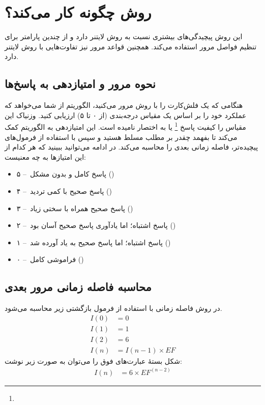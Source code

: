 \documentclass[12pt]{report}
\begin{document}
\section{روش  چگونه کار می‌کند؟}
این روش پیچیدگی‌های بیشتری نسبت به روش لایتنر دارد و از چندین پارامتر برای تنظیم فواصل مرور استفاده می‌کند.
همچنین قواعد مرور نیز تفاوت‌هایی با روش لایتنر دارد.
\subsection{نحوه مرور و امتیازدهی به پاسخ‌ها}
هنگامی که یک فلش‌کارت را با روش  
مرور می‌کنید، الگوریتم از شما می‌خواهد که عملکرد خود را بر اساس یک مقیاس درجه‌بندی 
(از ۰ تا ۵) 
ارزیابی کنید. وزنیاک این مقیاس را کیفیت پاسخ
\footnote{}
 یا به اختصار
 نامیده است.
 این امتیازدهی به الگوریتم کمک می‌کند تا بفهمد چقدر بر مطلب مسلط هستید و
سپس با استفاده از فرمول‌های پیچیده‌تر، 
فاصله زمانی بعدی را محاسبه می‌کند.
 در ادامه می‌توانید ببینید که هر کدام از این امتیازها به چه معنیست:

\begin{itemize}
    \item ۵ --~پاسخ کامل و بدون مشکل ()
    \item ۴ --~پاسخ صحیح با کمی تردید ()
    \item ۳ --~پاسخ صحیح همراه با سختی زیاد ()
    \item ۲ --~پاسخ اشتباه؛ اما یادآوری پاسخ صحیح آسان بود ()
    \item ۱ --~پاسخ اشتباه؛ اما پاسخ صحیح به یاد آورده شد ()
    \item ۰ --~فراموشی کامل ()
\end{itemize}

\subsection{محاسبه فاصله زمانی مرور بعدی}
در روش 
فاصله زمانی با استفاده از فرمول بازگشتی زیر محاسبه می‌شود.
\begin{align}
I(0) &= 0 \\
I(1) &= 1 \\
I(2) &= 6 \\
I(n) &= I(n-1) \times EF
\end{align}
شکل بستهٔ عبارت‌های فوق را می‌توان به صورت زیر نوشت:
\begin{align}
I(n) &= 6 \times EF^{(n-2)}
\end{align}
\end{document}
